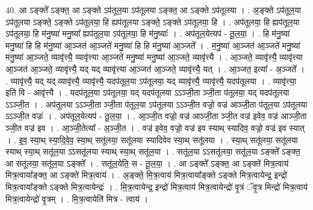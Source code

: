 \documentclass[17pt]{extarticle}
\begin{document}
40. आ ऽङ्क्ते᳚ ऽङ्क्त॒ आ ऽङ्क्ते ऽप॑तूल॒या ऽप॑तूलया ऽङ्क्त॒ आ ऽङ्क्ते ऽप॑तूलया । . अ॒ङ्क्ते ऽप॑तूल॒या ऽप॑तूलया ऽङ्क्ते॒ ऽङ्क्ते ऽप॑तूलया॒ हि ह्यप॑तूलया ऽङ्क्ते॒ ऽङ्क्ते ऽप॑तूलया॒ हि । . अप॑तूलया॒ हि ह्यप॑तूल॒या ऽप॑तूलया॒ हि म॑नु॒ष्या॑ मनु॒ष्या᳚ ह्यप॑तूल॒या ऽप॑तूलया॒ हि म॑नु॒ष्याः᳚ । . अप॑तूल॒येत्यप॑ - तू॒ल॒या॒ । . हि म॑नु॒ष्या॑ मनु॒ष्या॑ हि हि म॑नु॒ष्या॑ आ॒ञ्जत॑ आ॒ञ्जते॑ मनु॒ष्या॑ हि हि म॑नु॒ष्या॑ आ॒ञ्जते᳚ । . म॒नु॒ष्या॑ आ॒ञ्जत॑ आ॒ञ्जते॑ मनु॒ष्या॑ मनु॒ष्या॑ आ॒ञ्जते॒ व्यावृ॑त्त्यै॒ व्यावृ॑त्त्या आ॒ञ्जते॑ मनु॒ष्या॑ मनु॒ष्या॑ आ॒ञ्जते॒ व्यावृ॑त्त्यै । . आ॒ञ्जते॒ व्यावृ॑त्त्यै॒ व्यावृ॑त्त्या आ॒ञ्जत॑ आ॒ञ्जते॒ व्यावृ॑त्त्यै॒ यद् यद् व्यावृ॑त्त्या आ॒ञ्जत॑ आ॒ञ्जते॒ व्यावृ॑त्त्यै॒ यत् । . आ॒ञ्जत॒ इत्या᳚ - अ॒ञ्जते᳚ । . व्यावृ॑त्त्यै॒ यद् यद् व्यावृ॑त्त्यै॒ व्यावृ॑त्त्यै॒ यदप॑तूल॒या ऽप॑तूलया॒ यद् व्यावृ॑त्त्यै॒ व्यावृ॑त्त्यै॒ यदप॑तूलया । . व्यावृ॑त्त्या॒ इति॑ वि - आवृ॑त्त्यै । . यदप॑तूल॒या ऽप॑तूलया॒ यद् यदप॑तूलया ऽऽञ्जी॒ता ञ्जी॒ता प॑तूलया॒ यद् यदप॑तूलया ऽऽञ्जी॒त । . अप॑तूलया ऽऽञ्जी॒ता ञ्जी॒ता प॑तूल॒या ऽप॑तूलया ऽऽञ्जी॒त वज्रो॒ वज्र॑ आञ्जी॒ता प॑तूल॒या ऽप॑तूलया ऽऽञ्जी॒त वज्रः॑ । . अप॑तूल॒येत्यप॑ - तू॒ल॒या॒ । . आ॒ञ्जी॒त वज्रो॒ वज्र॑ आञ्जी॒ता ञ्जी॒त वज्र॑ इवेव॒ वज्र॑ आञ्जी॒ता ञ्जी॒त वज्र॑ इव । . आ॒ञ्जी॒तेत्या᳚ - अ॒ञ्जी॒त । . वज्र॑ इवेव॒ वज्रो॒ वज्र॑ इव स्याथ् स्यादिव॒ वज्रो॒ वज्र॑ इव स्यात् । . इ॒व॒ स्या॒थ् स्या॒दि॒वे॒व॒ स्या॒थ् सतू॑लया॒ सतू॑लया स्यादिवेव स्या॒थ् सतू॑लया । . स्या॒थ् सतू॑लया॒ सतू॑लया स्याथ् स्या॒थ् सतू॑ल॒या ऽऽसतू॑लया स्याथ् स्या॒थ् सतू॑ल॒या । . सतू॑ल॒या ऽऽसतू॑लया॒ सतू॑ल॒या ऽङ्क्ते᳚ ऽङ्क्त॒ आ सतू॑लया॒ सतू॑ल॒या ऽङ्क्ते᳚ । . सतू॑ल॒येति॒ स - तू॒ल॒या॒ । . आ ऽङ्क्ते᳚ ऽङ्क्त॒ आ ऽङ्क्ते॑ मित्र॒त्वाय॑ मित्र॒त्वाया᳚ङ्क्त॒ आ ऽङ्क्ते॑ मित्र॒त्वाय॑ । . अ॒ङ्क्ते॒ मि॒त्र॒त्वाय॑ मित्र॒त्वाया᳚ङ्क्ते ऽङ्क्ते मित्र॒त्वायेन्द्र॒ इन्द्रो॑ मित्र॒त्वाया᳚ङ्क्ते ऽङ्क्ते मित्र॒त्वायेन्द्रः॑ । . मि॒त्र॒त्वायेन्द्र॒ इन्द्रो॑ मित्र॒त्वाय॑ मित्र॒त्वायेन्द्रो॑ वृ॒त्रं ॅवृ॒त्र मिन्द्रो॑ मित्र॒त्वाय॑ मित्र॒त्वायेन्द्रो॑ वृ॒त्रम् । . मि॒त्र॒त्वायेति॑ मित्र - त्वाय॑ । \newline
\pagebreak
{}
\end{document}
